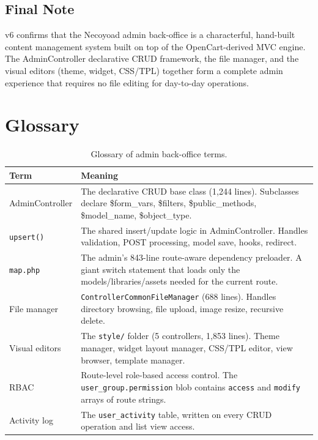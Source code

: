 \documentclass[11pt,a4paper]{article}
\begin{document}
\subsection{Final Note}

v6 confirms that the Necoyoad admin back-office is a
characterful, hand-built content management system built on top of
the OpenCart-derived MVC engine. The AdminController declarative CRUD
framework, the file manager, and the visual editors (theme, widget,
CSS/TPL) together form a complete admin experience that requires no
file editing for day-to-day operations.

\appendix
\section{Glossary}\label{app:glossary}
\begin{table}[htbp]
\centering
\caption{Glossary of admin back-office terms.}\label{tab:glossary-v6}
\footnotesize\sloppy
\begin{tabularx}{\columnwidth}{>{\raggedright\arraybackslash}p{3.5cm}X}
\toprule
\textbf{Term} & \textbf{Meaning} \\
\midrule
AdminController & The declarative CRUD base class (1,244 lines). Subclasses declare \$form\_vars, \$filters, \$public\_methods, \$model\_name, \$object\_type. \\
\texttt{upsert()} & The shared insert/update logic in AdminController. Handles validation, POST processing, model save, hooks, redirect. \\
\texttt{map.php} & The admin's 843-line route-aware dependency preloader. A giant switch statement that loads only the models/libraries/assets needed for the current route. \\
File manager & \texttt{ControllerCommonFileManager} (688 lines). Handles directory browsing, file upload, image resize, recursive delete. \\
Visual editors & The \texttt{style/} folder (5 controllers, 1,853 lines). Theme manager, widget layout manager, CSS/TPL editor, view browser, template manager. \\
RBAC & Route-level role-based access control. The \texttt{user\_group.permission} blob contains \texttt{access} and \texttt{modify} arrays of route strings. \\
Activity log & The \texttt{user\_activity} table, written on every CRUD operation and list view access. \\
\bottomrule
\end{tabularx}
\end{table}
\end{document}
